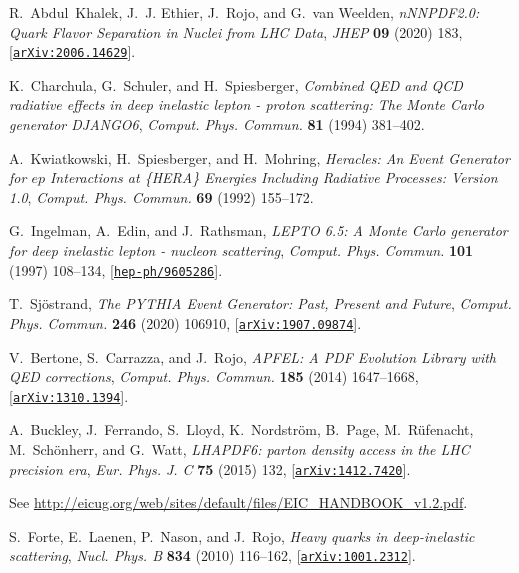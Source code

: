 \documentclass[11pt,a4paper]{article}
\begin{document}
\begin{thebibliography}{10}
  R.~Abdul~Khalek, J.~J. Ethier, J.~Rojo, and G.~van Weelden, {\it {nNNPDF2.0:
    Quark Flavor Separation in Nuclei from LHC Data}},  {\em JHEP} {\bf 09}
    (2020) 183, [\href{http://arxiv.org/abs/2006.14629}{{\tt arXiv:2006.14629}}].
  
  K.~Charchula, G.~Schuler, and H.~Spiesberger, {\it {Combined QED and QCD
    radiative effects in deep inelastic lepton - proton scattering: The Monte
    Carlo generator DJANGO6}},  {\em Comput. Phys. Commun.} {\bf 81} (1994)
    381--402.
  
  A.~Kwiatkowski, H.~Spiesberger, and H.~Mohring, {\it {Heracles: An Event
    Generator for $e p$ Interactions at \{HERA\} Energies Including Radiative
    Processes: Version 1.0}},  {\em Comput. Phys. Commun.} {\bf 69} (1992)
    155--172.
  
  G.~Ingelman, A.~Edin, and J.~Rathsman, {\it {LEPTO 6.5: A Monte Carlo generator
    for deep inelastic lepton - nucleon scattering}},  {\em Comput. Phys.
    Commun.} {\bf 101} (1997) 108--134,
    [\href{http://arxiv.org/abs/hep-ph/9605286}{{\tt hep-ph/9605286}}].
  
  T.~Sj\"ostrand, {\it {The PYTHIA Event Generator: Past, Present and Future}},
    {\em Comput. Phys. Commun.} {\bf 246} (2020) 106910,
    [\href{http://arxiv.org/abs/1907.09874}{{\tt arXiv:1907.09874}}].
  
  V.~Bertone, S.~Carrazza, and J.~Rojo, {\it {APFEL: A PDF Evolution Library with
    QED corrections}},  {\em Comput. Phys. Commun.} {\bf 185} (2014) 1647--1668,
    [\href{http://arxiv.org/abs/1310.1394}{{\tt arXiv:1310.1394}}].
  
  A.~Buckley, J.~Ferrando, S.~Lloyd, K.~Nordstr\"om, B.~Page, M.~R\"ufenacht,
    M.~Sch\"onherr, and G.~Watt, {\it {LHAPDF6: parton density access in the LHC
    precision era}},  {\em Eur. Phys. J. C} {\bf 75} (2015) 132,
    [\href{http://arxiv.org/abs/1412.7420}{{\tt arXiv:1412.7420}}].
  
  See
    \href{http://eicug.org/web/sites/default/files/EIC_HANDBOOK_v1.2.pdf}{http://eicug.org/web/sites/default/files/EIC\_HANDBOOK\_v1.2.pdf}.
  
  S.~Forte, E.~Laenen, P.~Nason, and J.~Rojo, {\it {Heavy quarks in
    deep-inelastic scattering}},  {\em Nucl. Phys. B} {\bf 834} (2010) 116--162,
    [\href{http://arxiv.org/abs/1001.2312}{{\tt arXiv:1001.2312}}].
  

\end{thebibliography}
\end{document}
